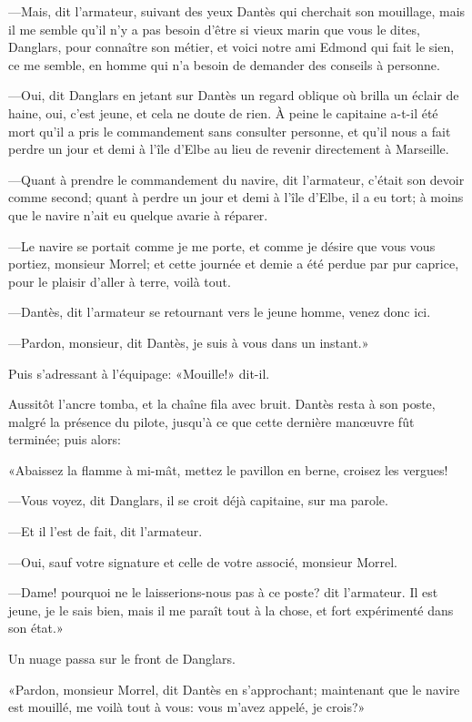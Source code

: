 —Mais, dit l'armateur, suivant des yeux Dantès qui cherchait son mouillage, mais il me semble qu'il n'y a pas besoin d'être si vieux marin que vous le dites, Danglars, pour connaître son métier, et voici notre ami Edmond qui fait le sien, ce me semble, en homme qui n'a besoin de demander des conseils à personne.

—Oui, dit Danglars en jetant sur Dantès un regard oblique où brilla un éclair de haine, oui, c'est jeune, et cela ne doute de rien. À peine le capitaine a-t-il été mort qu'il a pris le commandement sans consulter personne, et qu'il nous a fait perdre un jour et demi à l'île d'Elbe au lieu de revenir directement à Marseille.

—Quant à prendre le commandement du navire, dit l'armateur, c'était son devoir comme second; quant à perdre un jour et demi à l'île d'Elbe, il a eu tort; à moins que le navire n'ait eu quelque avarie à réparer.

—Le navire se portait comme je me porte, et comme je désire que vous vous portiez, monsieur Morrel; et cette journée et demie a été perdue par pur caprice, pour le plaisir d'aller à terre, voilà tout.

—Dantès, dit l'armateur se retournant vers le jeune homme, venez donc ici.

—Pardon, monsieur, dit Dantès, je suis à vous dans un instant.»

Puis s'adressant à l'équipage: «Mouille!» dit-il.

Aussitôt l'ancre tomba, et la chaîne fila avec bruit. Dantès resta à son poste, malgré la présence du pilote, jusqu'à ce que cette dernière manœuvre fût terminée; puis alors:

«Abaissez la flamme à mi-mât, mettez le pavillon en berne, croisez les vergues!

—Vous voyez, dit Danglars, il se croit déjà capitaine, sur ma parole.

—Et il l'est de fait, dit l'armateur.

—Oui, sauf votre signature et celle de votre associé, monsieur Morrel.

—Dame! pourquoi ne le laisserions-nous pas à ce poste? dit l'armateur. Il est jeune, je le sais bien, mais il me paraît tout à la chose, et fort expérimenté dans son état.»

Un nuage passa sur le front de Danglars.

«Pardon, monsieur Morrel, dit Dantès en s'approchant; maintenant que le navire est mouillé, me voilà tout à vous: vous m'avez appelé, je crois?»

